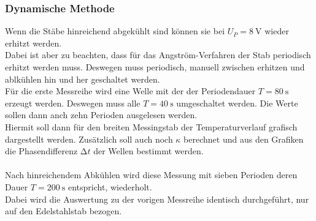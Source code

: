 \subsubsection{Dynamische Methode}
\noindent
Wenn die Stäbe hinreichend abgekühlt sind können sie bei $U_P=\SI{8}{\volt}$ wieder erhitzt werden.\\
Dabei ist aber zu beachten, dass für das Angström-Verfahren der Stab periodisch erhitzt werden muss.
Deswegen muss periodisch, manuell zwischen erhitzen und ablkühlen hin und her geschaltet werden.\\
Für die erste Messreihe wird eine Welle mit der der Periodendauer $T=\SI{80}{\second}$ erzeugt werden.
Deswegen muss alle $T=\SI{40}{\second}$ umgeschaltet werden. Die Werte sollen dann anch zehn Perioden ausgelesen werden.\\
Hiermit soll dann für den breiten Messingstab der Temperaturverlauf grafisch dargestellt werden. Zusätzlich soll auch noch $\kappa$ berechnet und aus den Grafiken die Phasendifferenz $\increment t$ der Wellen bestimmt werden.\\\\

\noindent
Nach hinreichendem Abkühlen wird diese Messung mit sieben Perioden deren Dauer $T=\SI{200}{\second}$ entspricht, wiederholt.\\
Dabei wird die Auswertung zu der vorigen Messreihe identisch durchgeführt, nur auf den Edelstahlstab bezogen.
